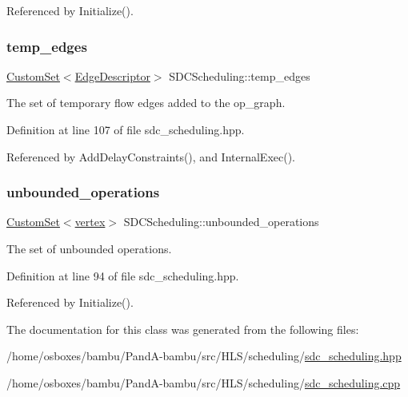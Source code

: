Referenced by Initialize().

\mbox{\label{classSDCScheduling_a9f2850cc4d2504a67b0f252e39f0f629}} 
\subsubsection{\texorpdfstring{temp\+\_\+edges}{temp\_edges}}
{\footnotesize\ttfamily \hyperlink{custom__set_8hpp_a615bc2f42fc38a4bb1790d12c759e86f}{Custom\+Set}$<$\hyperlink{graph_8hpp_a9eb9afea34e09f484b21f2efd263dd48}{Edge\+Descriptor}$>$ S\+D\+C\+Scheduling\+::temp\+\_\+edges\hspace{0.3cm}{\ttfamily [protected]}}



The set of temporary flow edges added to the op\+\_\+graph. 



Definition at line 107 of file sdc\+\_\+scheduling.\+hpp.



Referenced by Add\+Delay\+Constraints(), and Internal\+Exec().

\mbox{\label{classSDCScheduling_abd16d929f99a17c322b35db0d6ddfa25}} 
\subsubsection{\texorpdfstring{unbounded\+\_\+operations}{unbounded\_operations}}
{\footnotesize\ttfamily \hyperlink{custom__set_8hpp_a615bc2f42fc38a4bb1790d12c759e86f}{Custom\+Set}$<$\hyperlink{graph_8hpp_abefdcf0544e601805af44eca032cca14}{vertex}$>$ S\+D\+C\+Scheduling\+::unbounded\+\_\+operations\hspace{0.3cm}{\ttfamily [protected]}}



The set of unbounded operations. 



Definition at line 94 of file sdc\+\_\+scheduling.\+hpp.



Referenced by Initialize().



The documentation for this class was generated from the following files\+:\begin{DoxyCompactItemize}
\item 
/home/osboxes/bambu/\+Pand\+A-\/bambu/src/\+H\+L\+S/scheduling/\hyperlink{sdc__scheduling_8hpp}{sdc\+\_\+scheduling.\+hpp}\item 
/home/osboxes/bambu/\+Pand\+A-\/bambu/src/\+H\+L\+S/scheduling/\hyperlink{sdc__scheduling_8cpp}{sdc\+\_\+scheduling.\+cpp}\end{DoxyCompactItemize}
